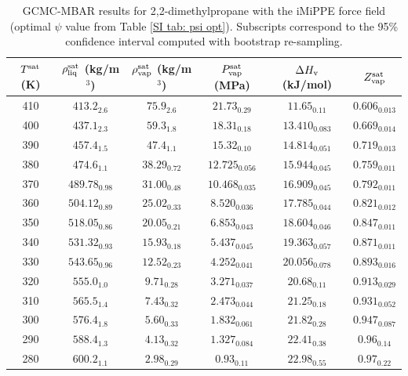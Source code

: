 \documentclass[journal=jctc,manuscript=article]{achemso}
\begin{document}
\begin{table}[htb!]
	\caption{GCMC-MBAR results for 2,2-dimethylpropane with the iMiPPE force field (optimal $\psi$ value from Table \ref{SI tab: psi opt}). Subscripts correspond to the 95\% confidence interval computed with bootstrap re-sampling.}
	\begin{center}
		\begin{tabular}{|c|c|c|c|c|c|}
			\hline
			$T^{\rm sat}$ (K) & $\rho_{\rm liq}^{\rm sat}$ (kg/m$^3$) & $\rho_{\rm vap}^{\rm sat}$ (kg/m$^3$) & $P_{\rm vap}^{\rm sat}$ (MPa) & $\Delta H_{\rm v}$ (kJ/mol) & $Z_{\rm vap}^{\rm sat}$ \\ \hline
			410 & $413.2_{2.6}$ & $75.9_{2.6}$ & $21.73_{0.29}$ & $11.65_{0.11}$ & $0.606_{0.013}$ \\
			400 & $437.1_{2.3}$ & $59.3_{1.8}$ & $18.31_{0.18}$ & $13.410_{0.083}$ & $0.669_{0.014}$ \\
			390 & $457.4_{1.5}$ & $47.4_{1.1}$ & $15.32_{0.10}$ & $14.814_{0.051}$ & $0.719_{0.013}$ \\
			380 & $474.6_{1.1}$ & $38.29_{0.72}$ & $12.725_{0.056}$ & $15.944_{0.045}$ & $0.759_{0.011}$ \\
			370 & $489.78_{0.98}$ & $31.00_{0.48}$ & $10.468_{0.035}$ & $16.909_{0.045}$ & $0.792_{0.011}$ \\
			360 & $504.12_{0.89}$ & $25.02_{0.33}$ & $8.520_{0.036}$ & $17.785_{0.044}$ & $0.821_{0.012}$ \\
			350 & $518.05_{0.86}$ & $20.05_{0.21}$ & $6.853_{0.043}$ & $18.604_{0.046}$ & $0.847_{0.011}$ \\
			340 & $531.32_{0.93}$ & $15.93_{0.18}$ & $5.437_{0.045}$ & $19.363_{0.057}$ & $0.871_{0.011}$ \\
			330 & $543.65_{0.96}$ & $12.52_{0.23}$ & $4.252_{0.041}$ & $20.056_{0.078}$ & $0.893_{0.016}$ \\
			320 & $555.0_{1.0}$ & $9.71_{0.28}$ & $3.271_{0.037}$ & $20.68_{0.11}$ & $0.913_{0.029}$ \\
			310 & $565.5_{1.4}$ & $7.43_{0.32}$ & $2.473_{0.044}$ & $21.25_{0.18}$ & $0.931_{0.052}$ \\
			300 & $576.4_{1.8}$ & $5.60_{0.33}$ & $1.832_{0.061}$ & $21.82_{0.28}$ & $0.947_{0.087}$ \\
			290 & $588.4_{1.3}$ & $4.13_{0.32}$ & $1.327_{0.084}$ & $22.41_{0.38}$ & $0.96_{0.14}$ \\
			280 & $600.2_{1.1}$ & $2.98_{0.29}$ & $0.93_{0.11}$ & $22.98_{0.55}$ & $0.97_{0.22}$ \\
			\hline
		\end{tabular}
	\end{center}
\end{table}
\end{document}
